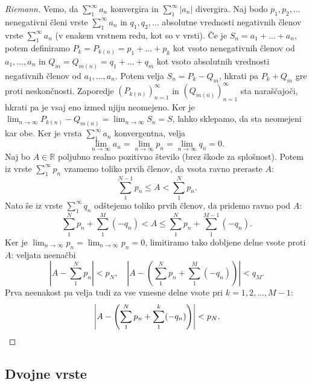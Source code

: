 \documentclass[10pt, a4paper]{article}
\newenvironment{noticeC}{%
  \tcolorbox[%
  notitle,
  empty,
  enhanced,  %
  breakable,
  coltext=black, 
  fontupper=\rmfamily,
  parbox=false,
  noparskip,
  sharp corners,
  boxrule=-1pt,  %
  frame hidden,
  left=7pt,  %
  right=7pt,
  top=5pt,
  bottom=5pt,
  before skip=2.5ex plus 2pt,
  after skip=2.5ex plus 2pt,
  overlay unbroken and last={%
  },
  ]}
{\endtcolorbox}
\newenvironment{dokaz}%
  {\begin{noticeC}\begin{proof}}%
  {\end{proof}\end{noticeC}}
\newcommand{\R}{\mathbb {R}}
\newcommand{\limzap}[1]{\lim_{n \to \infty} {#1}}
\begin{document}
\begin{dokaz}[Riemann]
    Vemo, da $\sum_1 ^\infty a_n$ konvergira in $\sum_1 ^\infty |a_n|$ divergira.
    Naj bodo $p_1, p_2, \dots$ nenegativni členi vrste $\sum_1 ^\infty a_n$ in $q_1, q_2, \dots$ absolutne vrednosti negativnih členov vrste $\sum_1 ^\infty a_n$ (v enakem vrstnem redu, kot so v vrsti).
    Če je $S_n = a_1 + \dots + a_n$, potem definiramo $P_k = P_{k(n)} = p_1 + \dots + p_k$ kot vsoto nenegativnih členov od $a_1, \dots, a_n$ in
    $Q_m = Q_{m(n)} = q_1 + \dots + q_m$ kot vsoto absolutnih vrednosti negativnih členov od $a_1, \dots, a_n$.
    Potem velja $S_n = P_k - Q_m$, hkrati pa $P_k + Q_m$ gre proti neskončnosti.
    Zaporedje $({P_{k(n)}})_{n=1} ^\infty$ in $({Q_{m(n)}})_{n=1} ^\infty$ sta naraščajoči, hkrati pa je vsaj eno izmed njiju neomejeno.
    Ker je $\limzap{P_{k(n)} - Q_{m(n)}} = \limzap{S_n} = S$, lahko sklepamo, da sta neomejeni kar obe.
    Ker je vrsta $\sum_1 ^\infty a_n$ konvergentna, velja $$\limzap{a_n} = \limzap{p_n} = \limzap{q_n} = 0.$$
    Naj bo $A \in \R$ poljubno realno pozitivno število (brez škode za splošnost).
    Potem iz vrste $\sum_1 ^\infty p_n$ vzamemo toliko prvih členov, da vsota ravno preraste $A$:
    $$\sum_1 ^{N-1} p_n \leq A < \sum_1 ^{N} p_n.$$
    Nato še iz vrste $\sum_1 ^\infty q_n$ odštejemo toliko prvih členov, da pridemo ravno pod $A$:
    $$\sum_1 ^{N} p_n + \sum_1 ^{M} (-q_n) < A \leq \sum_1 ^N p_n + \sum_1 ^{M-1} (-q_n).$$
    Ker je $\limzap{p_n} = \limzap{p_n} = 0$, limitiramo tako dobljene delne vsote proti $A$: veljata neenačbi
    $$\left| A - \sum_1 ^N p_n \right| < p_N,\quad \left| A - \left(\sum_1 ^N p_n + \sum_1 ^M (-q_n) \right) \right| < q_M.$$
    Prva neenakost pa velja tudi za vse vmesne delne vsote pri $k = 1, 2, \dots, M-1$:
    \begin{equation*}
        \left| A - \left(\sum_1 ^N p_n + \sum_1 ^k (-q_n) \right) \right| < p_N. \qedhere
    \end{equation*}
\end{dokaz}

\subsection{Dvojne vrste}
\end{document}
